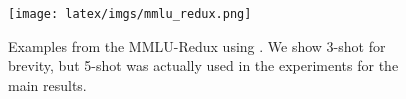 \begin{figure}[th!]
\centering
\texttt{[image: latex/imgs/mmlu\_redux.png]}
\caption{Examples from the MMLU-Redux using \wicd. We show 3-shot for brevity, but 5-shot was actually used in the experiments for the main results. }
\label{fig:mmlur-examples}
\end{figure} 